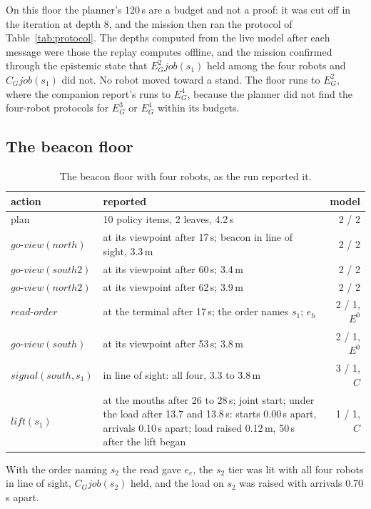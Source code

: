 \documentclass[11pt,a4paper]{article}
\theoremstyle{definition}
\newcommand{\Eop}[1]{E_{#1}}
\newcommand{\Cop}[1]{C_{#1}}
\newcommand{\ag}[1]{\mathit{#1}}
\newcommand{\job}{\mathit{job}}
\begin{document}
\noindent
On this floor the planner's 120\,s are a budget and not a proof: it was cut off
in the iteration at depth 8, and the mission then ran the protocol of
Table~\ref{tab:protocol}. The depths computed from the live model after each
message were those the replay computes offline, and the mission confirmed
through the epistemic state that $\Eop{G}^2\job(s_1)$ held among the four
robots and $\Cop{G}\job(s_1)$ did not. No robot moved toward a stand. The floor
runs to $\Eop{G}^2$, where the companion report's runs to $\Eop{G}^4$, because
the planner did not find the four-robot protocols for $\Eop{G}^3$ or
$\Eop{G}^4$ within its budgets.

\subsection{The beacon floor}

\begin{table}[H]
\centering\small
\caption{The beacon floor with four robots, as the run reported it.}
\label{tab:beacon-run}
\begin{tabularx}{\textwidth}{@{}l X r@{}}
\toprule
action & reported & model \\
\midrule
plan & 10 policy items, 2 leaves, 4.2\,s & 2 / 2 \\
$\mathit{go\text{-}view}(\ag{north})$ & at its viewpoint after 17\,s; beacon in line of sight, 3.3\,m & 2 / 2 \\
$\mathit{go\text{-}view}(\ag{south2})$ & at its viewpoint after 60\,s; 3.4\,m & 2 / 2 \\
$\mathit{go\text{-}view}(\ag{north2})$ & at its viewpoint after 62\,s; 3.9\,m & 2 / 2 \\
$\mathit{read\text{-}order}$ & at the terminal after 17\,s; the order names $s_1$; $e_h$ & 2 / 1, $E^0$ \\
$\mathit{go\text{-}view}(\ag{south})$ & at its viewpoint after 53\,s; 3.8\,m & 2 / 1, $E^0$ \\
$\mathit{signal}(\ag{south}, s_1)$ & in line of sight: all four, 3.3 to 3.8\,m & 3 / 1, $C$ \\
$\mathit{lift}(s_1)$ & at the mouths after 26 to 28\,s; joint start; under the load after 13.7 and 13.8\,s: starts 0.00\,s apart, arrivals 0.10\,s apart; load raised 0.12\,m, 50\,s after the lift began & 1 / 1, $C$ \\
\bottomrule
\end{tabularx}
\end{table}

\noindent
With the order naming $s_2$ the read gave $e_e$, the $s_2$ tier was lit with
all four robots in line of sight, $\Cop{G}\job(s_2)$ held, and the load on $s_2$
was raised with arrivals 0.70\,s apart.
\end{document}

